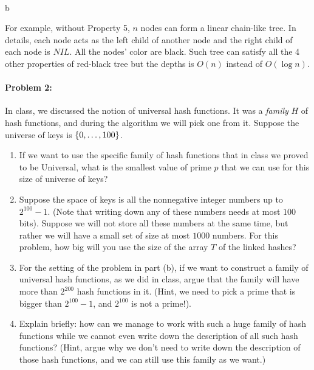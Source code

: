 \documentclass{article}
\begin{document}
\paragraph{}
b

For example, without Property 5, $n$ nodes can form a linear chain-like tree. In details, each node acts as the left child of another node and the right child of each node is $NIL$. All the nodes' color are black. Such tree can satisfy all the 4 other properties of red-black tree but the depths is $O(n)$ instead of $O(\log n)$.






\newpage
\paragraph{Problem 2:}
In class, we discussed the notion of universal hash functions. It was a \emph{family} $H$ of hash functions, and during the algorithm we will pick one from it. Suppose the universe of keys is $\{ 0,\dots,100 \}$.

\begin{enumerate}[label=\alph*]
\item If we want to use the specific family of hash functions that in class we proved to be Universal, what is the smallest value of prime $p$ that we can use for this size of universe of keys?

\item Suppose the space of keys is all the nonnegative integer numbers up to $2^{100}-1$. (Note that writing down any of these numbers needs at most $100$ bits). Suppose we will not store all these numbers at the same time, but rather we will have a small set of size at most $1000$ numbers. For this problem, how big will you use the size of the array $T$ of the linked hashes?

\item For the setting of the problem in part (b), if we want to construct a family of universal hash functions, as we did in class, argue that the family will have more than $2^{200}$ hash functions in it. (Hint, we need to pick a prime that is bigger than $2^{100}-1$, and $2^{100}$ is not a prime!).

\item Explain briefly: how can we manage to work with such a huge family of hash functions while we cannot even write down the description of all such hash functions? (Hint, argue why we don't need to write down the description of those hash functions, and we can still use this family as we want.)
\end{enumerate}
\end{document}
